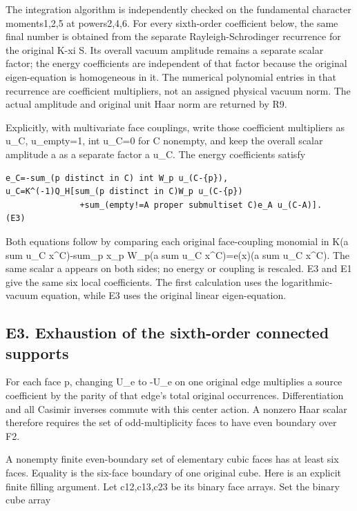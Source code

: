 \documentclass[11pt,a4paper]{article}
\newcounter{none}
\renewcommand{\[}{\begingroup\small\originaldisplaystart}
\renewcommand{\]}{\originaldisplayend\endgroup}
\begin{document}
The integration algorithm is independently checked on the fundamental
character moments1,2,5 at powers2,4,6. For every sixth-order coefficient
below, the same final number is obtained from the separate
Rayleigh-Schrodinger recurrence for the original K-xi S. Its overall
vacuum amplitude remains a separate scalar factor; the energy
coefficients are independent of that factor because the original
eigen-equation is homogeneous in it. The numerical polynomial entries in
that recurrence are coefficient multipliers, not an assigned physical
vacuum norm. The actual amplitude and original unit Haar norm are
returned by R9.

Explicitly, with multivariate face couplings, write those coefficient
multipliers as u\_C, u\_empty=1, int u\_C=0 for C nonempty, and keep the
overall scalar amplitude a as a separate factor a u\_C. The energy
coefficients satisfy

\begin{verbatim}
e_C=-sum_(p distinct in C) int W_p u_(C-{p}),
u_C=K^(-1)Q_H[sum_(p distinct in C)W_p u_(C-{p})
               +sum_(empty!=A proper submultiset C)e_A u_(C-A)].    (E3)
\end{verbatim}

Both equations follow by comparing each original face-coupling monomial
in K(a sum u\_C x\^{}C)-sum\_p x\_p W\_p(a sum u\_C x\^{}C)=e(x)(a sum
u\_C x\^{}C). The same scalar a appears on both sides; no energy or
coupling is rescaled. E3 and E1 give the same six local coefficients.
The first calculation uses the logarithmic-vacuum equation, while E3
uses the original linear eigen-equation.

\subsection{E3. Exhaustion of the sixth-order connected
supports}\label{e3.-exhaustion-of-the-sixth-order-connected-supports}

For each face p, changing U\_e to -U\_e on one original edge multiplies
a source coefficient by the parity of that edge's total original
occurrences. Differentiation and all Casimir inverses commute with this
center action. A nonzero Haar scalar therefore requires the set of
odd-multiplicity faces to have even boundary over F2.

A nonempty finite even-boundary set of elementary cubic faces has at
least six faces. Equality is the six-face boundary of one original cube.
Here is an explicit finite filling argument. Let c12,c13,c23 be its
binary face arrays. Set the binary cube array
\end{document}
